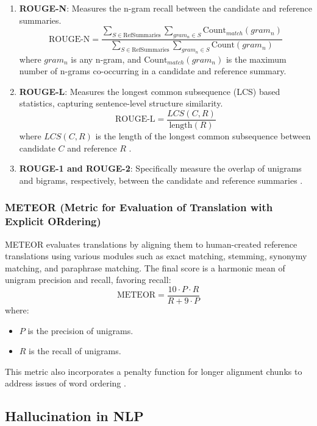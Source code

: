 \begin{enumerate}
    \item \textbf{ROUGE-N}: Measures the n-gram recall between the candidate and reference summaries.
    \[
    \text{ROUGE-N} = \frac{\sum_{S \in \text{RefSummaries}} \sum_{gram_n \in S} \text{Count}_{match}(gram_n)}{\sum_{S \in \text{RefSummaries}} \sum_{gram_n \in S} \text{Count}(gram_n)}
    \]
    where \( gram_n \) is any n-gram, and \( \text{Count}_{match}(gram_n) \) is the maximum number of n-grams co-occurring in a candidate and reference summary.

    \item \textbf{ROUGE-L}: Measures the longest common subsequence (LCS) based statistics, capturing sentence-level structure similarity.
    \[
    \text{ROUGE-L} = \frac{LCS(C, R)}{\text{length}(R)}
    \]
    where \( LCS(C, R) \) is the length of the longest common subsequence between candidate \( C \) and reference \( R \) \cite{Ng2015Better}.

    \item \textbf{ROUGE-1 and ROUGE-2}: Specifically measure the overlap of unigrams and bigrams, respectively, between the candidate and reference summaries \cite{Ganesan2015ROUGE}.
\end{enumerate}

\subsubsection*{METEOR (Metric for Evaluation of Translation with Explicit ORdering)}

METEOR evaluates translations by aligning them to human-created reference translations using various modules such as exact matching, stemming, synonymy matching, and paraphrase matching. The final score is a harmonic mean of unigram precision and recall, favoring recall:
\[
\text{METEOR} = \frac{10 \cdot P \cdot R}{R + 9 \cdot P}
\]
where:
\begin{itemize}
    \item \( P \) is the precision of unigrams.
    \item \( R \) is the recall of unigrams.
\end{itemize}

This metric also incorporates a penalty function for longer alignment chunks to address issues of word ordering \cite{Agarwal2008Meteor}.

\subsection*{Hallucination in NLP}

